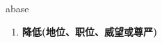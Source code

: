 
\begin{frame}
{\huge abase}
\begin{center}
\begin{enumerate}\Large
  \item \textbf{降低(地位、职位、威望或尊严)}
\end{enumerate}
\end{center}
\end{frame}
